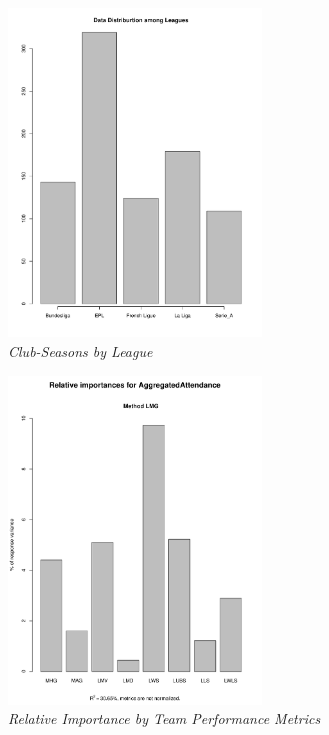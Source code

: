 \documentclass[inte,nonblindrev]{informs3} %
\begin{document}
\begin{figure}[!ht]
\centering\includegraphics[height = 0.5\textheight, width = 0.6\textwidth]{Figure4.pdf}
\caption{\textit{Club-Seasons by League}}
\end{figure}

\begin{figure}[!ht]
\centering\includegraphics[height = 0.5\textheight, width = 0.6\textwidth]{Figure5.pdf}
\caption{\textit{Relative Importance by Team Performance Metrics}}\label{Rel}
\end{figure}
\end{document}
